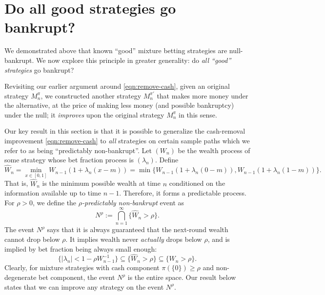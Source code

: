 \section{Do all good strategies go bankrupt?}\label{sec:all}

We demonstrated above that known ``good'' mixture betting strategies are null-bankrupt. We now explore this principle in greater generality: do \emph{all ``good'' strategies} go bankrupt?


Revisiting our earlier argument around \eqref{eqn:remove-cash}, given an original strategy $M_n^\pi$, we constructed another strategy $M_n^{\pi'}$ that  makes more money under the alternative, at the price of making less money (and possible bankruptcy) under the null; it \emph{improves}
 upon the original strategy $M_n^\pi$ in this sense.

Our key result in this section is that it is possible to generalize the cash-removal improvement \eqref{eqn:remove-cash} to \emph{all} strategies
on certain sample paths which we refer to as being ``predictably non-bankrupt''. Let $(W_n)$ be the wealth process of some strategy whose bet fraction process is $(\lambda_n)$. Define
\begin{equation}
    \widehat W_n = \min_{x \in [0,1] } W_{n-1}(1 + \lambda_n(x - m)) = \min\{ W_{n-1}(1 + \lambda_n(0 - m)),  W_{n-1}(1 + \lambda_n(1 - m))  \}.
\end{equation}
That is, $\widehat W_n$ is the minimum possible wealth at time $n$ conditioned on the information available up to time $n-1$. Therefore, it forms a predictable process. For $\rho > 0$, we define the \emph{$\rho$-predictably non-bankrupt} event as
\begin{equation}\label{eqn:pnb}
    N^{\rho} := \bigcap_{n=1}^\infty \{ \widehat W_n > \rho \}.
\end{equation}
The event $N^\rho$ says that it is always guaranteed that the next-round wealth cannot drop below $\rho$. It implies wealth never \emph{actually} drops below $\rho$, and is implied by bet fraction being always small enough:
\begin{equation}
    \{ |\lambda_n| < 1-\rho W_{n-1}^{-1} \} \subseteq \{ \widehat W_n > \rho \} \subseteq \{ W_n > \rho \}.
\end{equation}
Clearly, for mixture strategies with cash component $\pi(\{ 0 \}) \ge \rho$ and non-degenerate bet component, the event $N^\rho$ is the entire space. Our result below states that we can improve any strategy on the event $N^\rho$.

